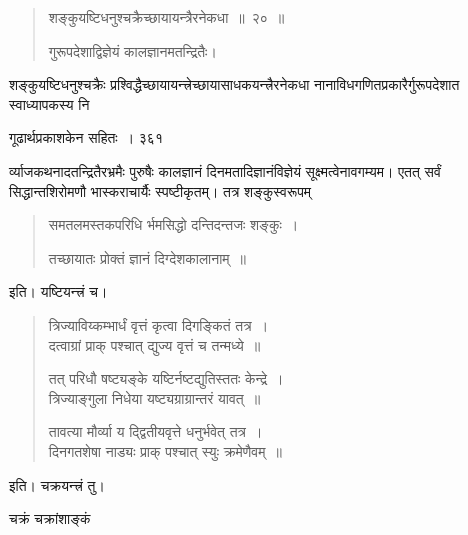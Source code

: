 \documentclass[11pt, openany]{book}
\begin{document}

  \begin{quote}
{\ssi शङ्कुयष्टिधनुश्चक्रैच्छायायन्त्रैरनेकधा~॥~२०~॥ 
  
गुरूपदेशाद्विज्ञेयं कालज्ञानमतन्द्रितैः। }
\end{quote}
 शङ्कुयष्टिधनुश्चक्रैः प्रश्विद्धैच्छायायन्त्त्रेच्छायासाधकयन्त्त्रैरनेकधा नानाविधगणितप्रकारैर्गुरूपदेशात स्वाध्यापकस्य नि \textendash



\newpage


\hspace{3cm} गूढार्थप्रकाशकेन सहितः~। \hfill ३६१
\vspace{1cm}


\noindent र्व्याजकथनादतन्द्रितैरभ्रमैः पुरुषैः कालज्ञानं दिनमतादिज्ञानंविज्ञेयं सूक्ष्मत्वेनावगम्यम। एतत् सर्वं सिद्धान्तशिरोमणौ भास्कराचार्यैः स्पष्टीकृतम्। तत्र शङ्कुस्वरूपम् \textendash

 \begin{quote}
{\ssi समतलमस्तकपरिधि
  र्भमसिद्धो दन्तिदन्तजः शङ्कुः~।
 
तच्छायातः प्रोक्तं
ज्ञानं दिग्देशकालानाम्~॥ }
\end{quote}
\noindent इति। यष्टियन्त्त्रं च। 

\begin{quote}
{\qt त्रिज्याविय्कम्भार्धं 
वृत्तं कृत्वा दिगङ्कितं तत्र~।\\
दत्वाग्रां प्राक् पश्चात्
द्युज्य वृत्तं च तन्मध्ये~॥

तत् परिधौ षष्ट्यङ्के
यष्टिर्नष्टद्युतिस्ततः केन्द्रे~।\\
त्रिज्याङ्गुला निधेया
यष्ट्यग्राग्रान्तरं यावत्~॥

तावत्या मौर्व्या य
द्द्वितीयवृत्ते धनुर्भवेत् तत्र~।\\
दिनगतशेषा नाड्यः
प्राक् पश्चात् स्युः क्रमेणैवम्~॥ }
\end{quote}
\noindent इति। चक्रयन्त्त्रं तु। 

\begin{center}
{\qt चक्रं चक्रांशाङ्कं }
\end{center}
%
\end{document}
